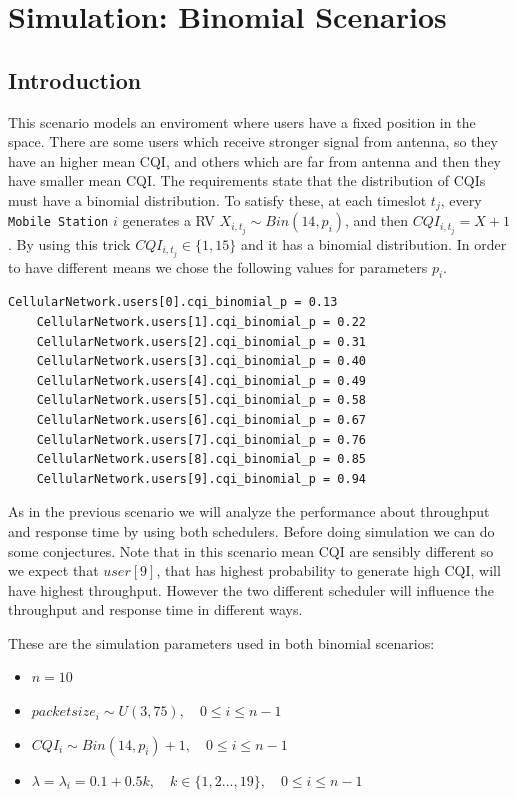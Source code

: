 \chapter{Simulation: Binomial Scenarios}
\section{Introduction}
This scenario models an enviroment where users have a fixed position in the space. There are some users which receive stronger signal from antenna, so they have an higher mean CQI, and others which are far from antenna and then they have smaller mean CQI. The requirements state that the distribution of CQIs must have a binomial distribution. To satisfy these, at each timeslot \(t_{j}\), every \texttt{Mobile Station} \(i\) generates a RV \(X_{i,t_{j}} \sim Bin(14,p_{i})\), and then \(CQI_{i,t_{j}} = X + 1\). By using this trick \(CQI_{i,t_{j}} \in \{1,15\}\) and it has a binomial distribution. In order to have different means we chose the following values for parameters \(p_{i}\).
\begin{lstlisting}[caption={omnet.ini - p parameters}]
	CellularNetwork.users[0].cqi_binomial_p = 0.13
	CellularNetwork.users[1].cqi_binomial_p = 0.22
	CellularNetwork.users[2].cqi_binomial_p = 0.31
	CellularNetwork.users[3].cqi_binomial_p = 0.40
	CellularNetwork.users[4].cqi_binomial_p = 0.49
	CellularNetwork.users[5].cqi_binomial_p = 0.58
	CellularNetwork.users[6].cqi_binomial_p = 0.67
	CellularNetwork.users[7].cqi_binomial_p = 0.76
	CellularNetwork.users[8].cqi_binomial_p = 0.85
	CellularNetwork.users[9].cqi_binomial_p = 0.94
\end{lstlisting}
As in the previous scenario we will analyze the performance about throughput and response time by using both schedulers. Before doing simulation we can do some conjectures. Note that in this scenario mean CQI are sensibly different so we expect that \(user[9]\), that has highest probability to generate high CQI, will have highest throughput. However the two different scheduler will influence the throughput and response time in different ways.

These are the simulation parameters used in both binomial scenarios:
\begin{itemize}
	\item \(n=10\)
	\item \(packetsize_{i} \sim U(3,75), \quad 0 \le i \le n-1\)
	\item \(CQI_{i} \sim Bin(14,p_{i})+1, \quad 0 \le i \le n-1\)
	\item \( \lambda = \lambda_{i} = 0.1 + 0.5k, \quad k\in\{1,2\ldots,19\}, \quad 0 \le i \le n-1\)
\end{itemize}

